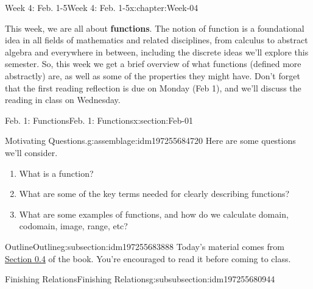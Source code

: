 \documentclass[oneside,10pt,]{book}
\newcommand{\terminology}[1]{\textbf{#1}}
\numberwithin{equation}{section}
\begin{document}
\begin{chapterptx}{Week 4: Feb. 1-5}{}{Week 4: Feb. 1-5}{}{}{x:chapter:Week-04}
\begin{introduction}{}%
This week, we are all about \terminology{functions}. The notion of function is a foundational idea in all fields of mathematics and related disciplines, from calculus to abstract algebra and everywhere in between, including the discrete ideas we'll explore this semester. So, this week we get a brief overview of what functions (defined more abstractly) are, as well as some of the properties they might have. Don't forget that the first reading reflection is due on Monday (Feb 1), and we'll discuss the reading in class on Wednesday.%
\end{introduction}%
%
%
\typeout{************************************************}
\typeout{************************************************}
%
\begin{sectionptx}{Feb. 1: Functions}{}{Feb. 1: Functions}{}{}{x:section:Feb-01}
\begin{introduction}{}%
\begin{assemblage}{Motivating Questions.}{g:assemblage:idm197255684720}%
Here are some questions we'll consider. %
\begin{enumerate}
\item{}What is a function?%
\item{}What are some of the key terms needed for clearly describing functions?%
\item{}What are some examples of functions, and how do we calculate domain, codomain, image, range, etc?%
\end{enumerate}
%
\end{assemblage}
\end{introduction}%
%
%
\typeout{************************************************}
\typeout{************************************************}
%
\begin{subsectionptx}{Outline}{}{Outline}{}{}{g:subsection:idm197255683888}
Today's material comes from \href{http://discrete.openmathbooks.org/dmoi3/sec_intro-functions.html}{Section 0.4} of the book. You're encouraged to read it before coming to class.%
%
%
\typeout{************************************************}
\typeout{************************************************}
%
\begin{subsubsectionptx}{Finishing Relations}{}{Finishing Relations}{}{}{g:subsubsection:idm197255680944}

\end{subsubsectionptx}
\end{subsectionptx}
\end{sectionptx}
\end{chapterptx}
\end{document}
